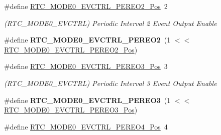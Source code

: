 \begin{DoxyCompactItemize}
\item 
\hypertarget{group___s_a_m_l21___r_t_c_ga0e8f89947646d75edd5c861c54d3e3d4}{}\#define \hyperlink{group___s_a_m_l21___r_t_c_ga0e8f89947646d75edd5c861c54d3e3d4}{R\+T\+C\+\_\+\+M\+O\+D\+E0\+\_\+\+E\+V\+C\+T\+R\+L\+\_\+\+P\+E\+R\+E\+O2\+\_\+\+Pos}~2\label{group___s_a_m_l21___r_t_c_ga0e8f89947646d75edd5c861c54d3e3d4}

\begin{DoxyCompactList}\small\item\em (R\+T\+C\+\_\+\+M\+O\+D\+E0\+\_\+\+E\+V\+C\+T\+R\+L) Periodic Interval 2 Event Output Enable \end{DoxyCompactList}\item 
\hypertarget{group___s_a_m_l21___r_t_c_ga1b303983945ea3b7855e0aea02f04fcd}{}\#define {\bfseries R\+T\+C\+\_\+\+M\+O\+D\+E0\+\_\+\+E\+V\+C\+T\+R\+L\+\_\+\+P\+E\+R\+E\+O2}~(1 $<$$<$ \hyperlink{group___s_a_m_l21___r_t_c_ga0e8f89947646d75edd5c861c54d3e3d4}{R\+T\+C\+\_\+\+M\+O\+D\+E0\+\_\+\+E\+V\+C\+T\+R\+L\+\_\+\+P\+E\+R\+E\+O2\+\_\+\+Pos})\label{group___s_a_m_l21___r_t_c_ga1b303983945ea3b7855e0aea02f04fcd}

\item 
\hypertarget{group___s_a_m_l21___r_t_c_ga33f7bace49d82e234204d2fff8d530f4}{}\#define \hyperlink{group___s_a_m_l21___r_t_c_ga33f7bace49d82e234204d2fff8d530f4}{R\+T\+C\+\_\+\+M\+O\+D\+E0\+\_\+\+E\+V\+C\+T\+R\+L\+\_\+\+P\+E\+R\+E\+O3\+\_\+\+Pos}~3\label{group___s_a_m_l21___r_t_c_ga33f7bace49d82e234204d2fff8d530f4}

\begin{DoxyCompactList}\small\item\em (R\+T\+C\+\_\+\+M\+O\+D\+E0\+\_\+\+E\+V\+C\+T\+R\+L) Periodic Interval 3 Event Output Enable \end{DoxyCompactList}\item 
\hypertarget{group___s_a_m_l21___r_t_c_ga51840a1ac7f8512a6c474ba56bc5e963}{}\#define {\bfseries R\+T\+C\+\_\+\+M\+O\+D\+E0\+\_\+\+E\+V\+C\+T\+R\+L\+\_\+\+P\+E\+R\+E\+O3}~(1 $<$$<$ \hyperlink{group___s_a_m_l21___r_t_c_ga33f7bace49d82e234204d2fff8d530f4}{R\+T\+C\+\_\+\+M\+O\+D\+E0\+\_\+\+E\+V\+C\+T\+R\+L\+\_\+\+P\+E\+R\+E\+O3\+\_\+\+Pos})\label{group___s_a_m_l21___r_t_c_ga51840a1ac7f8512a6c474ba56bc5e963}

\item 
\hypertarget{group___s_a_m_l21___r_t_c_ga56f5c240f7e4c95faef7928cb1242092}{}\#define \hyperlink{group___s_a_m_l21___r_t_c_ga56f5c240f7e4c95faef7928cb1242092}{R\+T\+C\+\_\+\+M\+O\+D\+E0\+\_\+\+E\+V\+C\+T\+R\+L\+\_\+\+P\+E\+R\+E\+O4\+\_\+\+Pos}~4\label{group___s_a_m_l21___r_t_c_ga56f5c240f7e4c95faef7928cb1242092}


\end{DoxyCompactItemize}
